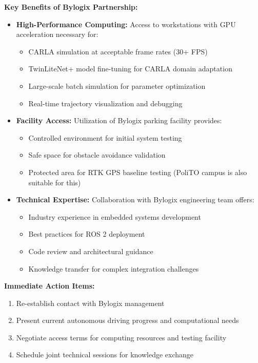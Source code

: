\textbf{Key Benefits of Bylogix Partnership:}
\begin{itemize}
    \item \textbf{High-Performance Computing:} Access to workstations with GPU acceleration necessary for:
    \begin{itemize}
        \item CARLA simulation at acceptable frame rates (30+ FPS)
        \item TwinLiteNet+ model fine-tuning for CARLA domain adaptation
        \item Large-scale batch simulation for parameter optimization
        \item Real-time trajectory visualization and debugging
    \end{itemize}

    \item \textbf{Facility Access:} Utilization of Bylogix parking facility provides:
    \begin{itemize}
        \item Controlled environment for initial system testing
        \item Safe space for obstacle avoidance validation
        \item Protected area for RTK GPS baseline testing (PoliTO campus is also suitable for this)
    \end{itemize}

    \item \textbf{Technical Expertise:} Collaboration with Bylogix engineering team offers:
    \begin{itemize}
        \item Industry experience in embedded systems development
        \item Best practices for ROS 2 deployment
        \item Code review and architectural guidance
        \item Knowledge transfer for complex integration challenges
    \end{itemize}
\end{itemize}

\textbf{Immediate Action Items:}
\begin{enumerate}
    \item Re-establish contact with Bylogix management
    \item Present current autonomous driving progress and computational needs
    \item Negotiate access terms for computing resources and testing facility
    \item Schedule joint technical sessions for knowledge exchange
\end{enumerate}

